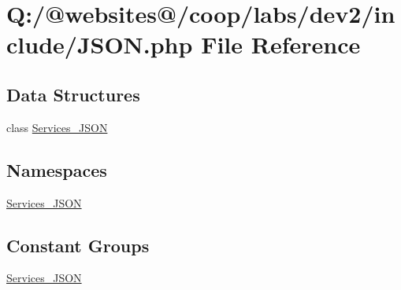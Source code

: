 \hypertarget{include_2json_8php}{\section{Q\-:/@websites@/coop/labs/dev2/include/\-J\-S\-O\-N.php File Reference}
\label{include_2json_8php}
}
\subsection*{Data Structures}
\begin{DoxyCompactItemize}
\item 
class \hyperlink{class_services___j_s_o_n}{Services\-\_\-\-J\-S\-O\-N}
\end{DoxyCompactItemize}
\subsection*{Namespaces}
\begin{DoxyCompactItemize}
\item 
\hyperlink{namespace_services___j_s_o_n}{Services\-\_\-\-J\-S\-O\-N}
\end{DoxyCompactItemize}
\subsection*{Constant Groups}
\begin{DoxyCompactItemize}
\item 
\hyperlink{namespace_services___j_s_o_n}{Services\-\_\-\-J\-S\-O\-N}
\end{DoxyCompactItemize}
